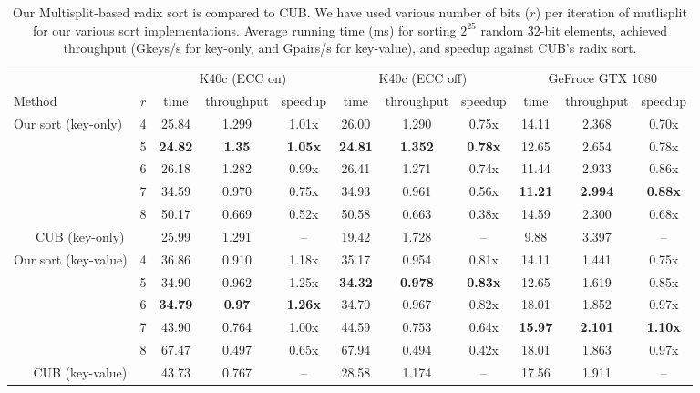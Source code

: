 \begin{table}
\centering
\scriptsize
\begin{tabular}{l c ccc | ccc | ccc}
\toprule
& & \multicolumn{3}{c}{K40c (ECC on)} & \multicolumn{3}{c}{K40c (ECC off)} & \multicolumn{3}{c}{GeFroce GTX 1080} \\  
\cmidrule(r){3-5} \cmidrule{6-8} \cmidrule(l){9-11}
Method & $r$ & time & throughput & speedup & time & throughput & speedup & time & throughput & speedup \\
\midrule
\multirow{5}{*}{Our sort (key-only)}
	& 4
		& 25.84 & 1.299 & 1.01x 		& 26.00 & 1.290 & 0.75x 				& 14.11 & 2.368 & 0.70x \\ 
	& 5
		& \textbf{24.82} & \textbf{1.35} & \textbf{1.05x} 	& \textbf{24.81} & \textbf{1.352} & \textbf{0.78x} 	& 12.65 & 2.654 & 0.78x \\
	& 6
		& 26.18 & 1.282 & 0.99x 	& 26.41 & 1.271 & 0.74x 	& 11.44 & 2.933 & 0.86x \\
	& 7
		& 34.59 & 0.970 & 0.75x 		& 34.93 & 0.961 & 0.56x 		& \textbf{11.21} & \textbf{2.994} & \textbf{0.88x} \\ 
	& 8 
		& 50.17 & 0.669 & 0.52x 		& 50.58 & 0.663 & 0.38x 		& 14.59 & 2.300 & 0.68x \\

		\midrule
		\multicolumn{2}{c}{CUB (key-only)} & 25.99 & 1.291 & -- & 19.42 & 1.728 & -- & 9.88 & 3.397 & -- \\
		\midrule
		\midrule
\multirow{5}{*}{Our sort (key-value)}
	& 4
		& 36.86 & 0.910 & 1.18x 		& 35.17 & 0.954 & 0.81x 		& 14.11 & 1.441 & 0.75x \\ 
	& 5
		& 34.90 & 0.962 & 1.25x 		& \textbf{34.32} & \textbf{0.978} & \textbf{0.83x} 		& 12.65 & 1.619 & 0.85x  \\
	& 6
		& \textbf{34.79} & \textbf{0.97} & \textbf{1.26x} 		& 34.70 & 0.967 & 0.82x 		& 18.01 & 1.852 & 0.97x  \\
	& 7
		& 43.90 & 0.764 & 1.00x 		& 44.59 & 0.753 & 0.64x 		& \textbf{15.97} & \textbf{2.101} & \textbf{1.10x}  \\ 
	& 8 
		& 67.47 & 0.497 & 0.65x 		& 67.94 & 0.494 & 0.42x 		& 18.01 & 1.863 & 0.97x \\

		\midrule
		\multicolumn{2}{c}{CUB (key-value)} & 43.73 & 0.767 & -- & 28.58 & 1.174 & -- & 17.56 & 1.911 & -- \\

\bottomrule
\end{tabular}
\caption{Our Multisplit-based radix sort is compared to CUB. We have used various number of bits ($r$) per iteration of mutlisplit for our various sort implementations. Average running time (ms) for sorting $2^{25}$ random 32-bit elements, achieved throughput (Gkeys/s for key-only, and Gpairs/s for key-value), and speedup against CUB's radix sort.}\label{table:sort}
\end{table}